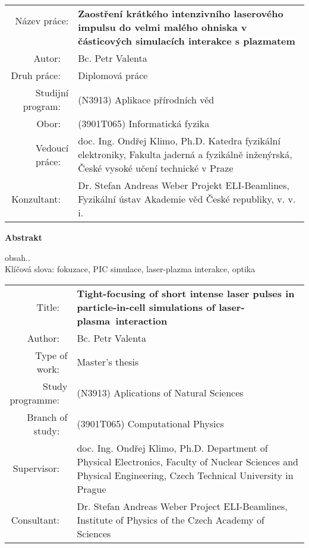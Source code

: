 \documentclass[12pt, twoside, a4paper, openright]{report}
\newcommand{\projecttitle}{Tight-focusing of short intense laser pulses in particle-in-cell simulations of laser-plasma~interaction }
\newcommand{\projecttitlecz}{Zaostření krátkého intenzivního laserového impulsu do velmi malého ohniska v částicových simulacích interakce s plazmatem }
\newcommand{\valenta}{Bc. Petr Valenta }
\newcommand{\klimo}{doc. Ing. Ondřej Klimo, Ph.D. }
\newcommand{\weber}{Dr. Stefan Andreas Weber }
\newcommand{\keywordscz}{fokuzace, PIC simulace, laser-plazma interakce, optika}
\begin{document}

\newpage
\thispagestyle{empty}
\mbox{}


\newpage
\begin{flushleft}
	\renewcommand{\arraystretch}{1.3}
	\begin{tabular}{r p{12cm}}
		Název práce:
		~ & \bf \projecttitlecz \\
		Autor:
		~ & \valenta \\
		Druh práce:
		~ & Diplomová práce \\
		Studijní program:
		~ & (N3913) Aplikace přírodních věd \\
		Obor:
		~ & (3901T065) Informatická fyzika \\
		Vedoucí práce:
		~ & \klimo \newline Katedra fyzikální elektroniky, Fakulta jaderná a fyzikálně inženýrská, České vysoké učení technické v Praze \\
		Konzultant:
		~ & \weber \newline Projekt ELI-Beamlines, Fyzikální ústav Akademie věd České republiky, v. v. i. \\
	\end{tabular}
\end{flushleft}

\begin{center}
\textbf{Abstrakt}\\
\end{center}

obsah.. \\

\noindent Klíčová slova: \keywordscz



\newpage
\begin{flushleft}
	\renewcommand{\arraystretch}{1.3}
	\begin{tabular}{r p{12cm}}
		Title:
		~ & \bf \projecttitle \\
		Author:
		~ & \valenta \\
		Type of work:
		~ & Master's thesis \\
		Study programme:
		~ & (N3913) Aplications of Natural Sciences	 \\
		Branch of study:
		~ & (3901T065) Computational Physics \\
		Supervisor:
		~ & \klimo \newline Department of Physical Electronics, Faculty of Nuclear Sciences and Physical Engineering, Czech Technical University in Prague \\
		Consultant:
		~ & \weber \newline Project ELI-Beamlines, Institute of Physics of the Czech Academy of Sciences \\
	\end{tabular}
\end{flushleft}
\end{document}
